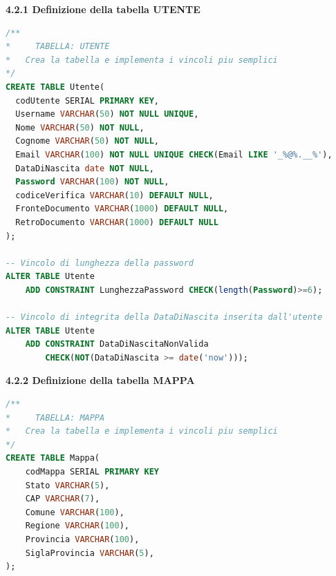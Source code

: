 \documentclass[a4paper,12pt]{article}
\begin{document}
{\flushleft \bf 4.2.1  Definizione della tabella UTENTE}
\begin{lstlisting}[language=SQL]
/**
*	  TABELLA: UTENTE
*   Crea la tabella e implementa i vincoli piu semplici
*/
CREATE TABLE Utente(
  codUtente SERIAL PRIMARY KEY,
  Username VARCHAR(50) NOT NULL UNIQUE,
  Nome VARCHAR(50) NOT NULL,
  Cognome VARCHAR(50) NOT NULL,
  Email VARCHAR(100) NOT NULL UNIQUE CHECK(Email LIKE '_%@%.__%'),
  DataDiNascita date NOT NULL,
  Password VARCHAR(100) NOT NULL,
  codiceVerifica VARCHAR(10) DEFAULT NULL,
  FronteDocumento VARCHAR(1000) DEFAULT NULL,
  RetroDocumento VARCHAR(1000) DEFAULT NULL
);

-- Vincolo di lunghezza della password
ALTER TABLE Utente
	ADD CONSTRAINT LunghezzaPassword CHECK(length(Password)>=6);
  
-- Vincolo di integrita della DataDiNascita inserita dall'utente  
ALTER TABLE Utente
	ADD CONSTRAINT DataDiNascitaNonValida 
		CHECK(NOT(DataDiNascita >= date('now')));
\end{lstlisting}

\vspace*{+1cm}

{\flushleft \bf 4.2.2  Definizione della tabella MAPPA}
\begin{lstlisting}[language=SQL]
/**
*	  TABELLA: MAPPA
*   Crea la tabella e implementa i vincoli piu semplici
*/
CREATE TABLE Mappa(
    codMappa SERIAL PRIMARY KEY
    Stato VARCHAR(5),
    CAP VARCHAR(7),
    Comune VARCHAR(100),
    Regione VARCHAR(100),
    Provincia VARCHAR(100),
    SiglaProvincia VARCHAR(5),
);
\end{lstlisting}
\newpage
\end{document}
